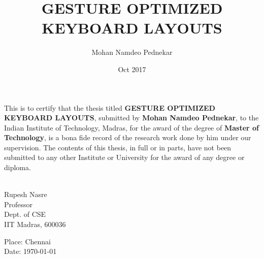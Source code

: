 \documentclass[MTech]{iitmdiss}
\begin{document}

\title{GESTURE OPTIMIZED KEYBOARD LAYOUTS}

\author{Mohan Namdeo Pednekar}

\date{Oct 2017}

\maketitle
\certificate

\vspace*{0.5in}

\noindent This is to certify that the thesis titled {\bf GESTURE OPTIMIZED KEYBOARD LAYOUTS}, submitted by {\bf Mohan Namdeo Pednekar}, 
  to the Indian Institute of Technology, Madras, for
the award of the degree of {\bf Master of Technology}, is a bona fide
record of the research work done by him under our supervision.  The
contents of this thesis, in full or in parts, have not been submitted
to any other Institute or University for the award of any degree or
diploma.

\vspace*{1.5in}

\begin{singlespacing}
\hspace*{-0.25in}
\parbox{2.5in}{
 \\
\noindent Rupesh Nasre \\ 
\noindent Professor \\
\noindent Dept. of CSE\\
\noindent IIT Madras, 600036
} 
\hspace*{1.0in} 
\end{singlespacing}
\vspace*{0.25in}
\noindent Place: Chennai\\
Date: \today 

\acknowledgements
\end{document}
